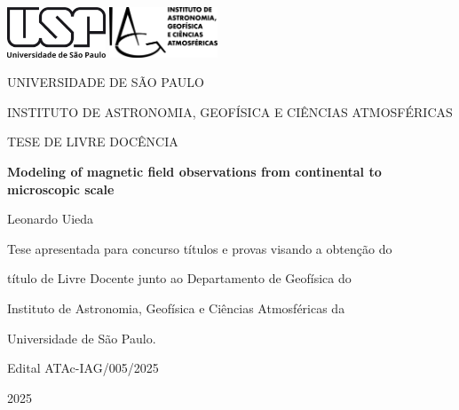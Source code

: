 \documentclass[10pt,a4paper,oneside]{book}
\newcommand{\ThesisYear}{2025}
\newcommand{\ThesisAuthor}{Leonardo Uieda}
\newcommand{\ThesisTitle}{Modeling of magnetic field observations from continental to microscopic scale}
\begin{document}
\pagestyle{plain}
\frontmatter

\begin{titlepage}
  \begin{center}
    \includegraphics[height=1.5cm]{images/usp.png}
    \hspace{1cm}
    \includegraphics[height=1.5cm]{images/iag.png}
    \vspace{1cm}

    UNIVERSIDADE DE SÃO PAULO

    INSTITUTO DE ASTRONOMIA, GEOFÍSICA E CIÊNCIAS ATMOSFÉRICAS
    \vspace{4cm}

    TESE DE LIVRE DOCÊNCIA
    \vspace{2cm}

    {\huge\bfseries \ThesisTitle{}}
    \vspace{2cm}

    {\Large \ThesisAuthor}
    \vspace{4cm}

    {\small
      Tese apresentada para concurso títulos e provas visando a obtenção do

      título de Livre Docente junto ao Departamento de Geofísica do

      Instituto de Astronomia, Geofísica e Ciências Atmosféricas da

      Universidade de São Paulo.
      \vspace{1cm}

      Edital ATAc-IAG/005/2025
    }
    \vfill

    \ThesisYear{}
  \end{center}
\end{titlepage}


\end{document}
